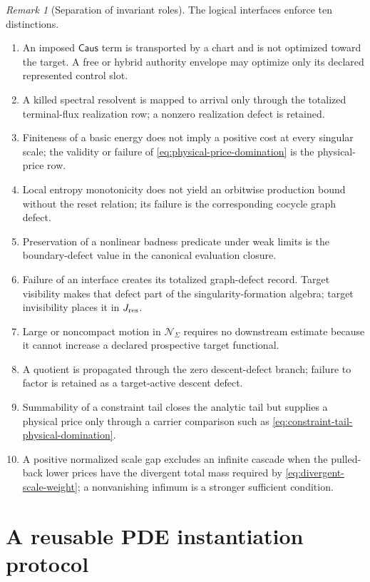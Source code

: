 \documentclass[11pt]{article}
\numberwithin{section}{part}
\theoremstyle{plain}
\theoremstyle{definition}
\theoremstyle{remark}
\newtheorem{remark}[remark]{Remark}
\newcommand{\Caus}{\mathsf{Caus}}
\newcommand{\Null}{\mathscr N}
\begin{document}
\begin{remark}[Separation of invariant roles]
The logical interfaces enforce ten distinctions.
\begin{enumerate}[label=\textup{(N\arabic*)}]
\item An imposed \(\Caus\) term is transported by a chart and is not
  optimized toward the target.  A free or hybrid authority envelope may
  optimize only its declared represented control slot.
\item A killed spectral resolvent is mapped to arrival only through the
  totalized terminal-flux realization row; a nonzero realization defect is
  retained.
\item Finiteness of a basic energy does not imply a positive cost at every
  singular scale; the validity or failure of
  \eqref{eq:physical-price-domination} is the physical-price row.
\item Local entropy monotonicity does not yield an orbitwise production bound without the
  reset relation; its failure is the corresponding cocycle graph defect.
\item Preservation of a nonlinear badness predicate under weak limits is the
  boundary-defect value in the canonical evaluation closure.
\item Failure of an interface creates its totalized graph-defect record.
  Target visibility makes that defect part of the singularity-formation
  algebra; target invisibility places it in \(J_{\rm res}\).
\item Large or noncompact motion in \(\Null_\Sigma\) requires no downstream
  estimate because it cannot increase a declared prospective target
  functional.
\item A quotient is propagated through the zero descent-defect branch;
  failure to factor is retained as a target-active descent defect.
\item Summability of a constraint tail closes the analytic tail but supplies
  a physical price only through a carrier comparison such as
  \eqref{eq:constraint-tail-physical-domination}.
\item A positive normalized scale gap excludes an infinite cascade when the
  pulled-back lower prices have the divergent total mass required by
  \eqref{eq:divergent-scale-weight}; a nonvanishing infimum is a stronger
  sufficient condition.
\end{enumerate}
\end{remark}

\section{A reusable PDE instantiation protocol}
\label{sec:pde-instantiation}
\end{document}
